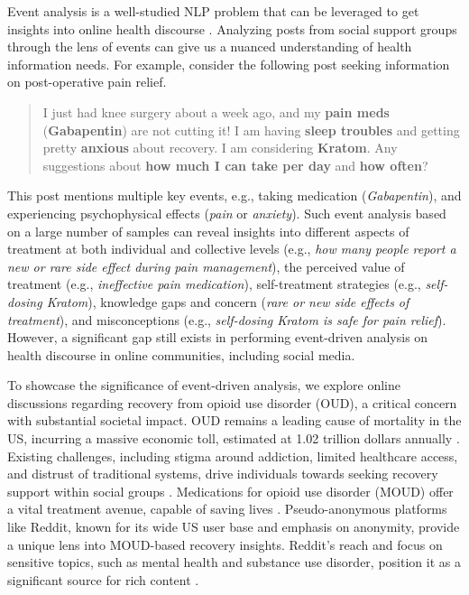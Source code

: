 \documentclass[letterpaper]{article}
\begin{document}
Event analysis is a well-studied NLP problem that can be leveraged to get insights into online health discourse \cite{ma-etal-2023-dice, naik-etal-2017-extracting}. Analyzing posts from social support groups through the lens of events can give us a nuanced understanding of health information needs. For example, consider the following post seeking information on post-operative pain relief.


\begin{quote}
   I just had knee surgery about a week ago, and my \textbf{pain meds }(\textbf{Gabapentin}) are not cutting it! I am having \textbf{sleep troubles} and getting pretty \textbf{anxious} about recovery. I am considering \textbf{Kratom}. Any suggestions about \textbf{how much I can take per day} and \textbf{how often}?
\end{quote}
This post mentions multiple key events, e.g., taking medication (\textit{Gabapentin}), and experiencing psychophysical effects (\textit{pain} or \textit{anxiety}). Such event analysis based on a large number of samples can reveal insights into different aspects of treatment at both individual and collective levels (e.g., \textit{how many people report a new or rare side effect during pain management}), the perceived value of treatment (e.g., \textit{ineffective pain medication}),  self-treatment strategies (e.g., \textit{self-dosing Kratom}), knowledge gaps and concern (\textit{rare or new side effects of treatment}), and misconceptions (e.g., \textit{self-dosing Kratom is safe for pain relief}). However, a significant gap still exists in performing event-driven analysis on health discourse in online communities, including social media.




To showcase the significance of event-driven analysis, we explore online discussions regarding recovery from opioid use disorder (OUD), a critical concern with substantial societal impact. OUD remains a leading cause of mortality in the US, incurring a massive economic toll, estimated at 1.02 trillion dollars annually \cite{FLORENCE2021108350}. Existing challenges, including stigma around addiction, limited healthcare access, and distrust of traditional systems, drive individuals towards seeking recovery support within social groups \cite{10.1001/jama.2014.2147}. Medications for opioid use disorder (MOUD) offer a vital treatment avenue, capable of saving lives \cite{mooney2020patient}. Pseudo-anonymous platforms like Reddit, known for its wide US user base and emphasis on anonymity, provide a unique lens into MOUD-based recovery insights. Reddit's reach and focus on sensitive topics, such as mental health and substance use disorder, position it as a significant source for rich content \cite{romano2023themedriven, 10.1145/3359249,sharma2020engagement}.
\end{document}
